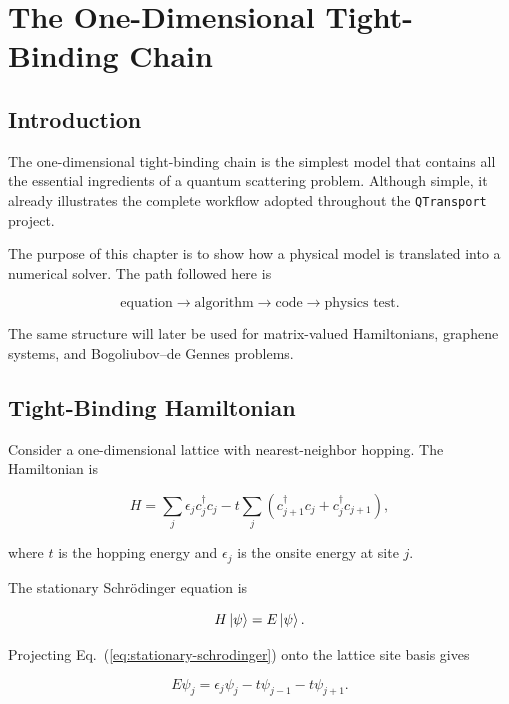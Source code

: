\chapter{The One-Dimensional Tight-Binding Chain}

\section{Introduction}

The one-dimensional tight-binding chain is the simplest model that
contains all the essential ingredients of a quantum scattering problem.
Although simple, it already illustrates the complete workflow adopted
throughout the \texttt{QTransport} project.

The purpose of this chapter is to show how a physical model is translated
into a numerical solver. The path followed here is

\[
	\text{equation}
	\longrightarrow
	\text{algorithm}
	\longrightarrow
	\text{code}
	\longrightarrow
	\text{physics test}.
\]

The same structure will later be used for matrix-valued Hamiltonians,
graphene systems, and Bogoliubov--de Gennes problems.

\section{Tight-Binding Hamiltonian}

Consider a one-dimensional lattice with nearest-neighbor hopping. The
Hamiltonian is

\begin{equation}
	H
	=
	\sum_j
	\epsilon_j c_j^\dagger c_j
	-
	t
	\sum_j
	\left(
	c_{j+1}^\dagger c_j
	+
	c_j^\dagger c_{j+1}
	\right),
	\label{eq:chain-hamiltonian}
\end{equation}

where $t$ is the hopping energy and $\epsilon_j$ is the onsite energy at
site $j$.

The stationary Schrödinger equation is

\begin{equation}
	H\ket{\psi}
	=
	E\ket{\psi}.
	\label{eq:stationary-schrodinger}
\end{equation}

Projecting Eq.~(\ref{eq:stationary-schrodinger}) onto the lattice site
basis gives

\begin{equation}
	E\psi_j
	=
	\epsilon_j\psi_j
	-
	t\psi_{j-1}
	-
	t\psi_{j+1}.
	\label{eq:chain-schrodinger}
\end{equation}

